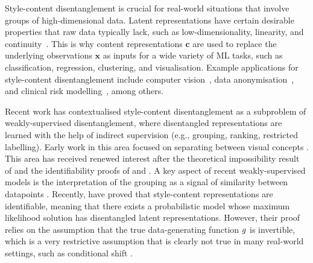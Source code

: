 \documentclass[../thesis.tex]{subfiles}
\begin{document}

Style-content disentanglement is crucial for real-world situations that involve groups of high-dimensional data. Latent representations have certain desirable properties that raw data typically lack, such as low-dimensionality, linearity, and continuity~\citep{bengioRepresentationLearningReview2014}. This is why content representations $\mathbf{c}$ are used to replace the underlying observations $\mathbf{x}$ as inputs for a wide variety of ML tasks, such as classification, regression, clustering, and visualisation. Example applications for style-content disentanglement include computer vision~\citep{tenenbaum2000separating}, data anonymisation~\citep{louizos2016variational}, and clinical risk modelling~\citep{pavlouHowDevelopMore2015}, among others.


Recent work \citep{shuWeaklySupervisedDisentanglement2019, locatelloWeaklySupervisedDisentanglementCompromises2020} has contextualised style-content disentanglement as a subproblem of weakly-supervised disentanglement, where disentangled representations are learned with the help of indirect supervision (e.g., grouping, ranking, restricted labelling). Early work in this area focused on separating between visual concepts \citep{reedDeepVisualAnalogyMaking2015,kulkarniDeepConvolutionalInverse2015}. This area has received renewed interest after the theoretical impossibility result of \citet{locatelloChallengingCommonAssumptions2019} and the identifiability proofs of \citet{khemakhemVariationalAutoencodersNonlinear2020} and \citet{mitaIdentifiableDoubleVAE2021}. A key aspect of recent weakly-supervised models is the interpretation of the grouping as a signal of similarity between datapoints \citep{chenWeaklySupervisedDisentanglement2020}. Recently, \citep{vonkugelgenSelfSupervisedLearningData2021} have proved that style-content representations are identifiable, meaning that there exists a probabilistic model whose maximum likelihood solution has disentangled latent representations. However, their proof relies on the assumption that the true data-generating function $g$ is invertible, which is a very restrictive assumption that is clearly not true in many real-world settings, such as conditional shift \citep{zhangDomainAdaptationTarget2013}.  
\end{document}
